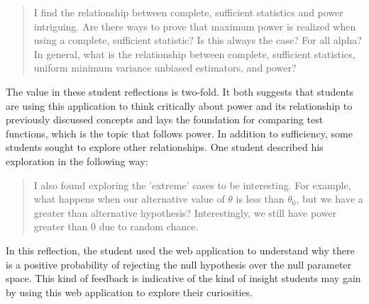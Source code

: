 \documentclass{TISE}
\begin{document}
\begin{quote}
	I find the relationship between complete, sufficient statistics and power intriguing. Are there ways to prove that maximum power is realized when using a complete, sufficient statistic? Is this always the case? For all alpha? In general, what is the relationship between complete, sufficient statistics, uniform minimum variance unbiased estimators, and power?
\end{quote}

The value in these student reflections is two-fold. It both suggests that students are using this application to think critically about power and its relationship to previously discussed concepts and lays the foundation for comparing test functions, which is the topic that follows power. In addition to sufficiency, some students sought to explore other relationships. One student described his exploration in the following way:

\begin{quote}
	I also found exploring the 'extreme' cases to be interesting. For example, what happens when our alternative value of $\theta$ is less than $\theta_0$, but we have a greater than alternative hypothesis? Interestingly, we still have power greater than 0 due to random chance.
\end{quote}

In this reflection, the student used the web application to understand why there is a positive probability of rejecting the null hypothesis over the null parameter space. This kind of feedback is indicative of the kind of insight students may gain by using this web application to explore their curiosities.
\end{document}
